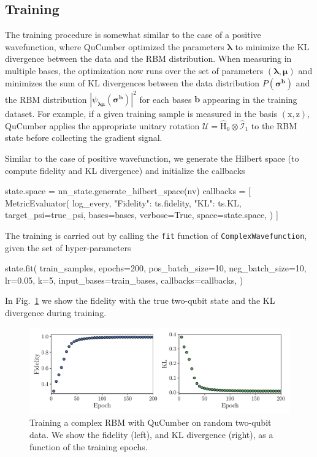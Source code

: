 \documentclass[submission, Phys, hidelinks]{SciPost}
\begin{document}
\subsection{Training}
The training procedure is somewhat similar to the case of a positive wavefunction, where QuCumber optimized the parameters $\bm{\lambda}$ to minimize the KL divergence between the data and the RBM distribution. When measuring in multiple bases, the optimization now runs over the set of parameters $(\bm{\lambda},\bm{\mu})$ and minimizes the sum of KL divergences between the data distribution $P(\bm{\sigma}^{\bm{b}})$ and the RBM distribution $|\psi_{\bm{\lambda\mu}}(\bm{\sigma}^{\bm{b}})|^2$ for each bases $\bm{b}$ appearing in the training dataset. For example, if a given training sample is measured in the basis $(\mathrm{x},\mathrm{z})$, QuCumber applies the appropriate unitary rotation $\bm{\mathcal{U}}=\hat{\mathrm{H}}_0\otimes\hat{\mathcal{I}}_1$ to the RBM state before collecting the gradient signal. 

Similar to the case of positive wavefunction, we generate the Hilbert space (to compute fidelity and KL divergence) and initialize the callbacks
\begin{python}
state.space = nn_state.generate_hilbert_space(nv)
callbacks = [
  MetricEvaluator(
    log_every,
    {"Fidelity": ts.fidelity, "KL": ts.KL},
    target_psi=true_psi,
    bases=bases,
    verbose=True,
    space=state.space,
  )
]

\end{python}
The training is carried out by calling the \verb|fit| function of \verb|ComplexWavefunction|, given the set of hyper-parameters
\begin{python}
state.fit(
	train_samples,
	epochs=200,
	pos_batch_size=10,
	neg_batch_size=10,
	lr=0.05,
	k=5,
	input_bases=train_bases,
	callbacks=callbacks,
)
\end{python}

In Fig.~\ref{fig:complex} we show the fidelity with the true two-qubit state and the KL divergence during training. 
\begin{figure}[htb]
    \centering{}
    \includegraphics[width=\textwidth]{plots/complex_fid_KL.pdf}
    \caption{\label{fig:complex} Training a complex RBM with QuCumber on random two-qubit data. We show the fidelity (left), and KL divergence (right), as a function of the training epochs.}
\end{figure}
\end{document}
